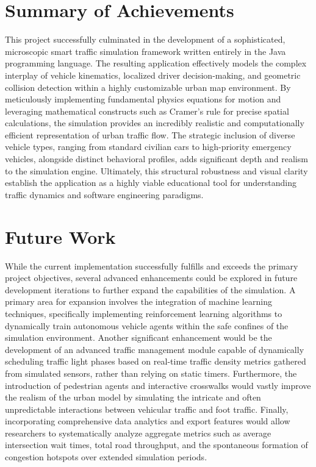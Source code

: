 \documentclass[../report_main.tex]{subfiles}
\begin{document}
\section{Summary of Achievements}
This project successfully culminated in the development of a sophisticated, microscopic smart traffic simulation framework written entirely in the Java programming language. The resulting application effectively models the complex interplay of vehicle kinematics, localized driver decision-making, and geometric collision detection within a highly customizable urban map environment. By meticulously implementing fundamental physics equations for motion and leveraging mathematical constructs such as Cramer's rule for precise spatial calculations, the simulation provides an incredibly realistic and computationally efficient representation of urban traffic flow. The strategic inclusion of diverse vehicle types, ranging from standard civilian cars to high-priority emergency vehicles, alongside distinct behavioral profiles, adds significant depth and realism to the simulation engine. Ultimately, this structural robustness and visual clarity establish the application as a highly viable educational tool for understanding traffic dynamics and software engineering paradigms.

\section{Future Work}
While the current implementation successfully fulfills and exceeds the primary project objectives, several advanced enhancements could be explored in future development iterations to further expand the capabilities of the simulation. A primary area for expansion involves the integration of machine learning techniques, specifically implementing reinforcement learning algorithms to dynamically train autonomous vehicle agents within the safe confines of the simulation environment. Another significant enhancement would be the development of an advanced traffic management module capable of dynamically scheduling traffic light phases based on real-time traffic density metrics gathered from simulated sensors, rather than relying on static timers. Furthermore, the introduction of pedestrian agents and interactive crosswalks would vastly improve the realism of the urban model by simulating the intricate and often unpredictable interactions between vehicular traffic and foot traffic. Finally, incorporating comprehensive data analytics and export features would allow researchers to systematically analyze aggregate metrics such as average intersection wait times, total road throughput, and the spontaneous formation of congestion hotspots over extended simulation periods.
\end{document}
